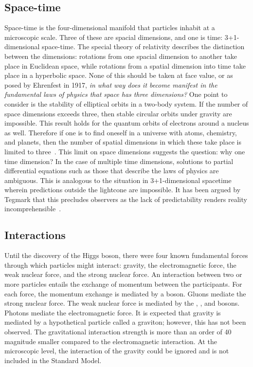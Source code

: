 \subsection{Space-time}

Space-time is the four-dimensional manifold that particles inhabit at a microscopic scale.
Three of these are spacial dimensions, and one is time: 3+1-dimensional space-time.
The special theory of relativity describes the distinction between the dimensions: rotations from one spacial dimension to another take place in Euclidean space, while rotations from a spatial dimension into time take place in a hyperbolic space.
None of this should be taken at face value, or as posed by Ehrenfest in 1917, \emph{in what way does it become manifest in the fundamental laws of physics that space has three dimensions?}
One point to consider is the stability of elliptical orbits in a two-body system.
If the number of space dimensions exceeds three, then stable circular orbits under gravity are impossible.
This result holds for the quantum orbits of electrons around a nucleus as well.
Therefore if one is to find oneself in a universe with atoms, chemistry, and planets, then the number of spatial dimensions in which these take place is limited to three~\cite{ehrenfest}.
This limit on space dimensions suggests the question: why one time dimension?
In the case of multiple time dimensions, solutions to partial differential equations such as those that describe the laws of physics are ambiguous.
This is analogous to the situation in 3+1-dimensional spacetime wherein predictions outside the lightcone are impossible.
It has been argued by Tegmark that this precludes observers as the lack of predictability renders reality incomprehensible~\cite{tegmark-time}.


\subsection{Interactions}
Until the discovery of the Higgs boson, there were four known fundamental forces through which particles might interact: gravity, the electromagnetic force, the weak nuclear force, and the strong nuclear force.
An interaction between two or more particles entails the exchange of momentum between the participants.
For each force, the momentum exchange is mediated by a boson.
Gluons mediate the strong nuclear force.
The weak nuclear force is mediated by the \Wp, \Wm, and \Z bosons.
Photons mediate the electromagnetic force.
It is expected that gravity is mediated by a hypothetical particle called a graviton; however, this has not been observed. The gravitational interaction strength is more than an order of 40 magnitude smaller compared to the electromagnetic interaction. At the microscopic level, the interaction of the gravity could be ignored and is not included in the Standard Model.

